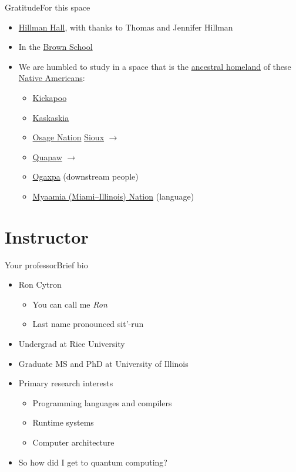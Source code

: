 \begin{frame}{Gratitude}{For this space}
\begin{itemize}
    \item \href{https://wustl.edu/about/campuses/danforth-campus/hillman-hall/}{Hillman Hall}, with thanks to Thomas and Jennifer Hillman
    \item In the \href{https://brownschool.wustl.edu/about/Pages/default.aspx}{Brown School}
    \item We are humbled to study in a space that is the \href{https://native-land.ca/resources/territory-acknowledgement/}{ancestral homeland} of these \href{https://en.wikipedia.org/wiki/Native_Americans_in_the_United_States}{Native Americans}:
    \begin{itemize}
        \item \href{https://en.wikipedia.org/wiki/Kickapoo_people}{Kickapoo}
        \item \href{https://en.wikipedia.org/wiki/Kaskaskia}{Kaskaskia}
        \item \href{https://en.wikipedia.org/wiki/Osage_Nation}{Osage Nation}
        \href{https://en.wikipedia.org/wiki/Sioux}{Sioux} $\rightarrow$
        \item \Indent{2em}\href{https://en.wikipedia.org/wiki/Quapaw}{Quapaw} $\rightarrow$
        \item \Indent{4em}\href{https://www.quapawtribe.com/401/Tribal-Name}{Ogaxpa} (downstream people)
        \item \href{https://en.wikipedia.org/wiki/Miami_people}{Myaamia (Miami--Illinois) Nation} (language)
        \end{itemize}
\end{itemize}
\end{frame}
\section{Instructor}
\begin{frame}{Your professor}{Brief bio}
\begin{itemize}
    \item Ron Cytron
    \begin{itemize}
        \item You can call me \emph{Ron}
        \item Last name pronounced sit'-run
    \end{itemize}
    \item Undergrad at Rice University
    \item Graduate MS and PhD at University of Illinois
    \item Primary research interests
    \begin{itemize}
        \item Programming languages and compilers
        \item Runtime systems
        \item Computer architecture
    \end{itemize}
    \item So how did I get to quantum computing?
\end{itemize}
    
\end{frame}

